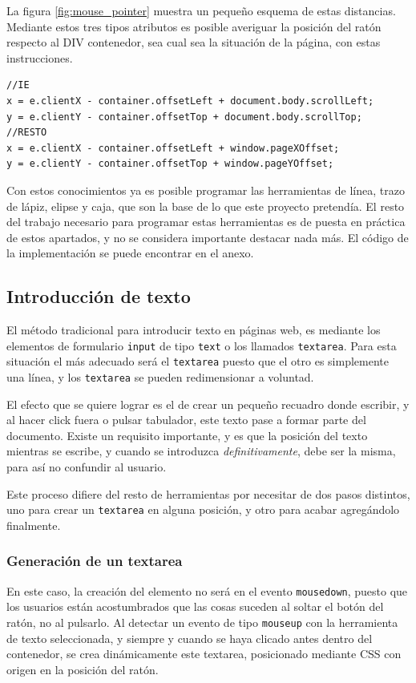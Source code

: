 La figura \ref{fig:mouse_pointer} muestra un pequeño esquema de estas distancias. Mediante estos tres tipos atributos es posible averiguar la posición del ratón respecto al DIV contenedor, sea cual sea la situación de la página, con estas instrucciones.

\begin{verbatim}
//IE
x = e.clientX - container.offsetLeft + document.body.scrollLeft;
y = e.clientY - container.offsetTop + document.body.scrollTop;
//RESTO
x = e.clientX - container.offsetLeft + window.pageXOffset;
y = e.clientY - container.offsetTop + window.pageYOffset;
\end{verbatim}

Con estos conocimientos ya es posible programar las herramientas de línea, trazo de lápiz, elipse y caja, que son la base de lo que este proyecto pretendía. El resto del trabajo necesario para programar estas herramientas es de puesta en práctica de estos apartados, y no se considera importante destacar nada más. El código de la implementación se puede encontrar en el anexo.



\subsection{Introducción de texto} %
\label{sub:introduccion_de_texto}

El método tradicional para introducir texto en páginas web, es mediante los elementos de formulario \texttt{input} de tipo \texttt{text} o los llamados \texttt{textarea}. Para esta situación el más adecuado será el \texttt{textarea} puesto que el otro es simplemente una línea, y los \texttt{textarea} se pueden redimensionar a voluntad.

El efecto que se quiere lograr es el de crear un pequeño recuadro donde escribir, y al hacer click fuera o pulsar tabulador, este texto pase a formar parte del documento. Existe un requisito importante, y es que la posición del texto mientras se escribe, y cuando se introduzca \emph{definitivamente}, debe ser la misma, para así no confundir al usuario.

Este proceso difiere del resto de herramientas por necesitar de dos pasos distintos, uno para crear un \texttt{textarea} en alguna posición, y otro para acabar agregándolo finalmente.

\subsubsection{Generación de un textarea} %
\label{ssub:generacion_de_un_textarea}
En este caso, la creación del elemento no será en el evento \texttt{mousedown}, puesto que los usuarios están acostumbrados que las cosas suceden al soltar el botón del ratón, no al pulsarlo. Al detectar un evento de tipo \texttt{mouseup} con la herramienta de texto seleccionada, y siempre y cuando se haya clicado antes dentro del contenedor, se crea dinámicamente este textarea, posicionado mediante CSS con origen en la posición del ratón.

